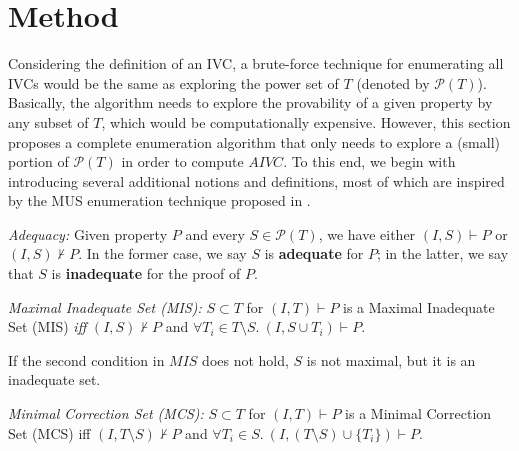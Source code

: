 \section{Method}
\label{sec:allivcs}

\newcommand{\getivc}{\textsc{GetIVC}}
\newcommand{\getmodel}{\textsc{GetLiteralsFromMaxModel}}
\newcommand{\aivcalg}{AIVC\xspace}
\newcommand{\blockup}{\textsc{BlockUp}}
\newcommand{\blockdown}{\textsc{BlockDown}}
\newcommand{\mis}{\textsc{MIS}}
\newcommand{\mcs}{\textsc{MCS}}

\newcommand{\checksat}{\textsc{CheckSat}}
\newcommand{\isadeq}{\textsc{CheckAdq}}
\newcommand{\actlit}{\textsc{ActLit}}
\newcommand{\unsatcore}{\textsc{UnsatCore}\xspace}
\newcommand{\unsat}{\texttt{UNSAT}\xspace}
\newcommand{\sat}{\texttt{SAT}\xspace}

Considering the definition of an IVC, a brute-force technique for enumerating all IVCs would be the same as exploring the power set of $T$ (denoted by $ \mathcal{P}(T) $).
Basically, the algorithm needs to explore the provability of a
given property by any subset of $T$, which would be computationally expensive.
However, this section proposes a complete
enumeration algorithm that only needs to explore a (small) portion of $\mathcal{P}(T)$
in order to compute $AIVC$. To this end, we begin with introducing several additional notions and definitions, most of which are inspired by the MUS enumeration technique proposed in \cite{marco2016fast}.

\begin{definition} {\emph{Adequacy:}}
\label{def:adeq}
Given property $P$ and every $S \in \mathcal{P}(T)$, we have either $(I, S) \vdash P$ or $(I, S) \nvdash P$. In the former case, we say $S$ is \textbf{adequate} for $P$; in the latter, we say that $S$ is \textbf{inadequate} for the proof of $P$.
\end{definition}

\begin{definition}{\emph{Maximal Inadequate Set (MIS):}}
  \label{def:mis}
  $S \subset T$ for $(I, T) \vdash P$ is a Maximal Inadequate Set (MIS) \emph{iff}
  $(I, S) \nvdash P$ and $\forall T_i \in T\setminus S.~ (I, S\cup{T_i}) \vdash P$.
\end{definition}
\begin{note}
If the second condition in $MIS$ does not hold, $S$ is not maximal, but it is an inadequate set.
\end{note}

\begin{definition}{\emph{Minimal Correction Set (MCS):}}
  \label{def:mcs}
  $S \subset T$ for $(I, T) \vdash P$ is a Minimal Correction Set (MCS) iff
  $(I, T \setminus S) \nvdash P$ and $\forall T_i \in S.~ (I, (T \setminus S)\cup \{T_i\}) \vdash P$.
\end{definition}

